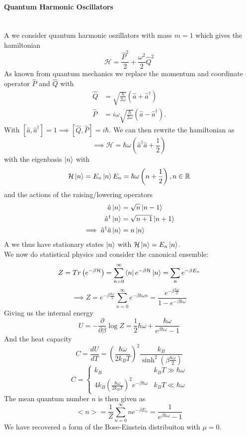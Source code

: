 \documentclass{report}
\begin{document}
\paragraph{Quantum Harmonic Oscillators} \\
A we consider quantum harmonic oszillators with mass $m = 1$ which gives the hamiltonian \[
  \mathcal{H} = \frac{\hat{P}^2}{2} + \frac{\omega^2}{2} \hat{Q}^2
\] As known from quantum mechanics we replace the momentum and coordinate operator $\hat{P}$ and $\hat{Q}$ with 
\begin{align*}
  \hat{Q} &= \sqrt{\frac{\hbar}{2 \omega}}  \left( \hat{a} + \hat{a}^{\dagger} \right)  \\
  \hat{P} &= i \omega \sqrt{\frac{\hbar}{2 \omega}} \left( \hat{a} - \hat{a}^{\dagger} \right)  
.\end{align*} 
With $[\hat{a}, \hat{a}^{\dagger}] = 1 \implies [\hat{Q}, \hat{P}] = i \hbar$. We can then rewrite the hamiltonian as \[
  \implies \mathcal{H} = \hbar \omega \left( \hat{a}^{\dagger} \hat{a} + \frac{1}{2} \right) 
\] with the eigenbasis $\ket{n}$ with \[
\mathcal{H} \ket{n} = E_n \ket{n} \\
E_n = \hbar \omega\left( n + \frac{1}{2} \right) , n \in \mathbb{R}
\] and the actions of the raising/lowering operators 
\begin{align*}
  \hat{a} \ket{n} &= \sqrt{n} \ket{n-1}\\
  \hat{a}^{\dagger} \ket{n} &= \sqrt{n+1}  \ket{n+1} \\
  \implies \hat{a}^{\dagger} \hat{a} \ket{n} &= n \ket{n}
\end{align*}
A we thus have stationary states $\ket{n}$ with $\mathcal{H} \ket{n} = E_n \ket{n}$.\\
We now do statistical physics and consider the canonical ensemble: \[
  Z = Tr\left( e^{-\beta \mathcal{H}} \right) = \sum_{n=0}^{\infty} \bra{n} e^{-\beta \mathcal{H}} \ket{n} = \sum_{n}^{} e^{-\beta E_n}
\] \[
\implies Z = e^{-\beta \frac{\hbar \omega}{2}} \sum_{n=0}^{\infty} e^{-\beta \hbar \omega n} = \frac{e^{-\beta \frac{\hbar \omega}{2}}}{1 - e^{-\beta \hbar \omega}}
\] 
Giving us the internal energy \[
U = - \frac{\partial }{\partial \beta} \log Z = \frac{1}{2} \hbar \omega + \frac{\hbar \omega}{e^{\beta \hbar \omega} - 1}
\] 
And the heat capacity \[
  C = \frac{dU}{dT} = \left( \frac{\hbar \omega}{2 k_B T} \right)^2 \frac{k_B}{\sinh^2\left( \beta \frac{\hbar \omega}{2} \right) }
\] \[
C = \begin{cases}
 k_B & k_B T \gg \hbar \omega \\
 4 k_B \left( \frac{\hbar \omega}{2 k_B T} \right)^2 e^{-\beta \hbar \omega} & k_B T \ll \hbar \omega
\end{cases}
\] 
The mean quantum number $n$ is then given as \[
<n> = \frac{1}{Z} \sum_{n=0}^{\infty} n e^{-\beta E_n} = \frac{1}{e^{\beta \hbar \omega} - 1}
\] We have recovered a form of the Bose-Einstein distribuiton with $\mu = 0$.
\end{document}
